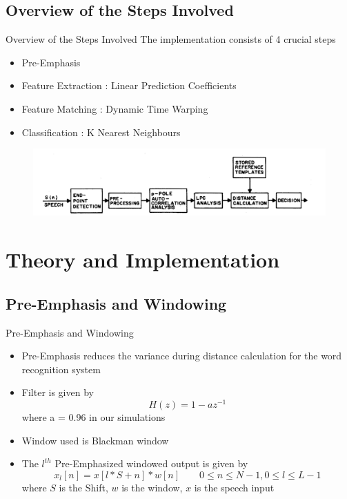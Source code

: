 \documentclass{beamer}
\begin{document}
\subsection{Overview of the Steps Involved}
\begin{frame}{Overview of the Steps Involved}
The implementation consists of 4 crucial steps
\begin{itemize}
    \item Pre-Emphasis
    \item Feature Extraction :  Linear Prediction Coefficients
    \item Feature Matching   : Dynamic Time  Warping
    \item Classification     : K Nearest Neighbours
\end{itemize}
\begin{figure}
\includegraphics[width=\textwidth]{Block_digram.PNG}
\end{figure}

\end{frame}

\section{Theory and Implementation}

\subsection{Pre-Emphasis and Windowing} 

\begin{frame}{Pre-Emphasis and Windowing}
\begin{itemize}
\item Pre-Emphasis reduces the variance during distance calculation for the word recognition system
\item Filter is given by
\begin{equation}
    H(z) = 1-az^{-1}
\end{equation}
where a = 0.96 in our simulations

\item Window used is Blackman window
\item The $l^{th}$ Pre-Emphasized windowed output is given by
\begin{equation}
    x_l[n] = x[l*S + n]*w[n] \qquad 0\leq n\leq N-1, 0 \leq l \leq L-1
\end{equation}
where $S$ is the Shift, $w$ is the window, $x$ is the speech input
\end{itemize}

\end{frame}
\end{document}
